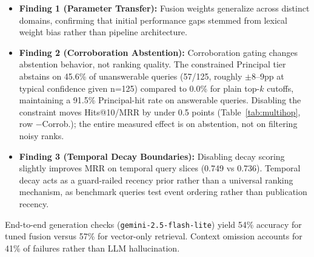 \documentclass[conference,a4paper]{IEEEtran}
\begin{document}
\begin{itemize}
\item \textbf{Finding 1 (Parameter Transfer):} Fusion weights generalize across distinct domains, confirming that initial performance gaps stemmed from lexical weight bias rather than pipeline architecture.
\item \textbf{Finding 2 (Corroboration Abstention):} Corroboration gating changes abstention behavior, not ranking quality. The constrained Principal tier abstains on 45.6\% of unanswerable queries (57/125, roughly $\pm$8--9pp at typical confidence given n=125) compared to 0.0\% for plain top-$k$ cutoffs, maintaining a 91.5\% Principal-hit rate on answerable queries. Disabling the constraint moves Hits@10/MRR by under 0.5 points (Table~\ref{tab:multihop}, row $-$Corrob.); the entire measured effect is on abstention, not on filtering noisy ranks.
\item \textbf{Finding 3 (Temporal Decay Boundaries):} Disabling decay scoring slightly improves MRR on temporal query slices (0.749 vs 0.736). Temporal decay acts as a guard-railed recency prior rather than a universal ranking mechanism, as benchmark queries test event ordering rather than publication recency.
\end{itemize}

End-to-end generation checks (\texttt{gemini-2.5-flash-lite}) yield 54\% accuracy for tuned fusion versus 57\% for vector-only retrieval. Context omission accounts for 41\% of failures rather than LLM hallucination.
\end{document}
